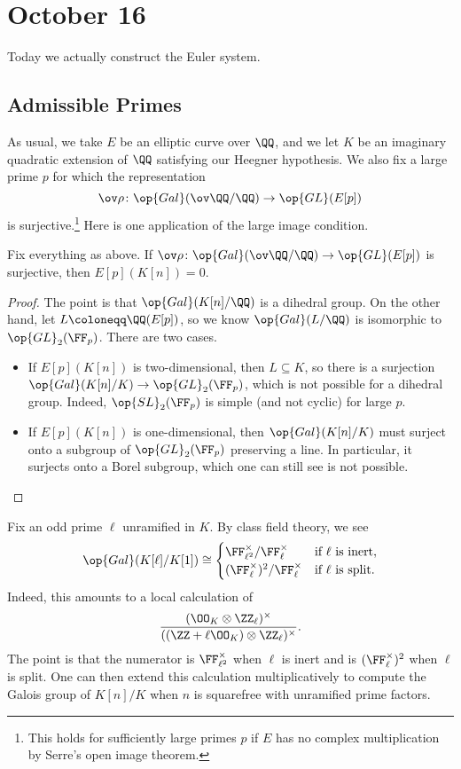 \documentclass[../notes.tex]{subfiles}
\begin{document}
\section{October 16}
Today we actually construct the Euler system.

\subsection{Admissible Primes}
As usual, we take $E$ be an elliptic curve over $\QQ$, and we let $K$ be an imaginary quadratic extension of $\QQ$ satisfying our Heegner hypothesis. We also fix a large prime $p$ for which the representation
\[\ov\rho\colon\op{Gal}(\ov\QQ/\QQ)\to\op{GL}(E[p])\]
is surjective.\footnote{This holds for sufficiently large primes $p$ if $E$ has no complex multiplication by Serre's open image theorem.} Here is one application of the large image condition.
\begin{lemma} \label{lem:large-imgae-to-no-torsion}
	Fix everything as above. If $\ov\rho\colon\op{Gal}(\ov\QQ/\QQ)\to\op{GL}(E[p])$ is surjective, then $E[p](K[n])=0$.
\end{lemma}
\begin{proof}
	The point is that $\op{Gal}(K[n]/\QQ)$ is a dihedral group. On the other hand, let $L\coloneqq\QQ(E[p])$, so we know $\op{Gal}(L/\QQ)$ is isomorphic to $\op{GL}_2(\FF_p)$. There are two cases.
	\begin{itemize}
		\item If $E[p](K[n])$ is two-dimensional, then $L\subseteq K$, so there is a surjection $\op{Gal}(K[n]/K)\to\op{GL}_2(\FF_p)$, which is not possible for a dihedral group. Indeed, $\op{SL}_2(\FF_p)$ is simple (and not cyclic) for large $p$.
		\item If $E[p](K[n])$ is one-dimensional, then $\op{Gal}(K[n]/K)$ must surject onto a subgroup of $\op{GL}_2(\FF_p)$ preserving a line. In particular, it surjects onto a Borel subgroup, which one can still see is not possible.
		\qedhere
	\end{itemize}
\end{proof}
\begin{remark} \label{rem:easy-galois-k-n}
	Fix an odd prime $\ell$ unramified in $K$. By class field theory, we see
	\[\op{Gal}(K[\ell]/K[1])\cong\begin{cases}
		\FF^\times_{\ell^2}/\FF_\ell^\times & \text{if }\ell\text{ is inert}, \\
		(\FF_\ell^\times)^2/\FF_\ell^\times & \text{if }\ell\text{ is split}.
	\end{cases}\]
	Indeed, this amounts to a local calculation of
	\[\frac{(\OO_K\otimes\ZZ_\ell)^\times}{((\ZZ+\ell\OO_K)\otimes\ZZ_\ell)^\times}.\]
	The point is that the numerator is $\FF_{\ell^2}^\times$ when $\ell$ is inert and is $(\FF_\ell^\times)^2$ when $\ell$ is split. One can then extend this calculation multiplicatively to compute the Galois group of $K[n]/K$ when $n$ is squarefree with unramified prime factors.
\end{remark}
\end{document}
